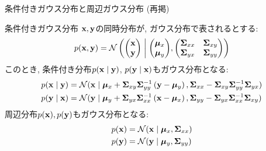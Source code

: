 \documentclass[dvipdfmx,notheorems,t]{beamer}
\begin{document}
\begin{frame}{条件付きガウス分布と周辺ガウス分布 (再掲)}
\begin{block}{条件付きガウス分布}
  $\vb{x}, \vb{y}$の同時分布が, ガウス分布で表されるとする:
  \begin{align*}
    p(\vb{x}, \vb{y}) = \mathcal{N} \left( \mqty(\vb{x} \\ \vb{y}) \middlerel|
      \mqty(\vb*{\mu}_x \\ \vb*{\mu}_y),
      \mqty(\vb{\Sigma}_{xx} & \vb{\Sigma}_{xy} \\
        \vb{\Sigma}_{yx} & \vb{\Sigma}_{yy}) \right)
  \end{align*}
  このとき, 条件付き分布$p(\vb{x} \mid \vb{y})$, $p(\vb{y} \mid \vb{x})$もガウス分布となる:
  \begin{align*}
    p(\vb{x} \mid \vb{y}) &= \mathcal{N}(\vb{x} \mid \vb*{\mu}_x
      + \vb{\Sigma}_{xy} \vb{\Sigma}_{yy}^{-1} \left( \vb{y} - \vb*{\mu}_y \right),
      \vb{\Sigma}_{xx} - \vb{\Sigma}_{xy} \vb{\Sigma}_{yy}^{-1} \vb{\Sigma}_{yx}) \\
    p(\vb{y} \mid \vb{x}) &= \mathcal{N}(\vb{y} \mid \vb*{\mu}_y
      + \vb{\Sigma}_{yx} \vb{\Sigma}_{xx}^{-1} \left( \vb{x} - \vb*{\mu}_x \right),
      \vb{\Sigma}_{yy} - \vb{\Sigma}_{yx} \vb{\Sigma}_{xx}^{-1} \vb{\Sigma}_{xy})
  \end{align*}
  周辺分布$p(\vb{x}), p(\vb{y})$もガウス分布となる:
  \begin{align*}
    p(\vb{x}) &= \mathcal{N}(\vb{x} \mid \vb*{\mu}_x, \vb{\Sigma}_{xx}) \\
    p(\vb{y}) &= \mathcal{N}(\vb{y} \mid \vb*{\mu}_y, \vb{\Sigma}_{yy})
  \end{align*}
\end{block}
\end{frame}
\end{document}

